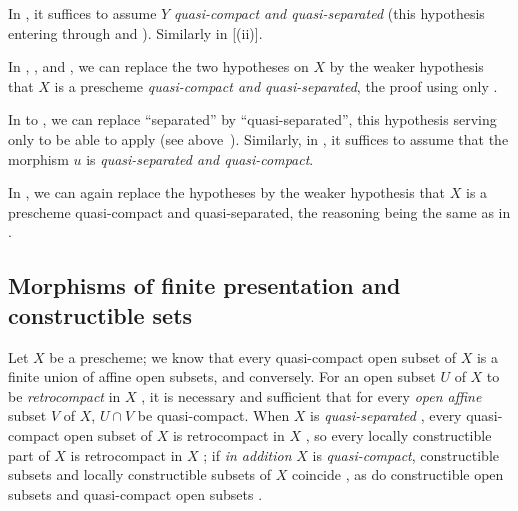 \begin{env}[1.7.19]
\label{IV.1.7.19}
In , it suffices to assume $Y$ \emph{quasi-compact and quasi-separated} (this hypothesis entering through  and ).
Similarly in [(ii)].
\end{env}

\begin{env}[1.7.20]
\label{IV.1.7.20}
In , , and , we can replace the two hypotheses on $X$ by the weaker hypothesis that $X$ is a prescheme \emph{quasi-compact and quasi-separated}, the proof using only .
\end{env}

\begin{env}[1.7.21]
\label{IV.1.7.21}
In  to , we can replace ``separated'' by ``quasi-separated'', this hypothesis serving only to be able to apply  (see above~).
Similarly, in , it suffices to assume that the morphism $u$ is \emph{quasi-separated and quasi-compact}.
\end{env}

\begin{env}[1.7.22]
\label{IV.1.7.22}
In , we can again replace the hypotheses by the weaker hypothesis that $X$ is a prescheme quasi-compact and quasi-separated, the reasoning being the same as in .
\end{env}

\subsection{Morphisms of finite presentation and constructible sets}
\label{subsection:IV.1.8}


\begin{env}[1.8.1]
\label{IV.1.8.1}
Let $X$ be a prescheme; we know that every quasi-compact open subset of $X$ is a finite union of affine open subsets, and conversely.
For an open subset $U$ of $X$ to be \emph{retrocompact} in $X$ , it is necessary and sufficient that for every \emph{open affine} subset $V$ of $X$, $U\cap V$ be quasi-compact.
When $X$ is \emph{quasi-separated} , every quasi-compact open subset of $X$ is retrocompact in $X$ , so every locally constructible part of $X$ is retrocompact in $X$ ; if \emph{in addition} $X$ is \emph{quasi-compact}, constructible subsets and locally constructible subsets of $X$ coincide , as do constructible open subsets and quasi-compact open subsets .
\end{env}

